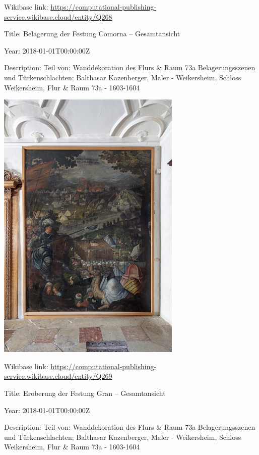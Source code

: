 \documentclass[
  letterpaper,
]{book}
\begin{document}
Wikibase link:
\url{https://computational-publishing-service.wikibase.cloud/entity/Q268}

Title: Belagerung der Festung Comorna -- Gesamtansicht

Year: 2018-01-01T00:00:00Z

Description: Teil von: Wanddekoration des Flurs \& Raum 73a
Belagerungsszenen und Türkenschlachten; Balthasar Kazenberger, Maler -
Weikersheim, Schloss Weikersheim, Flur \& Raum 73a - 1603-1604

\includegraphics{paintings_files/figure-pdf/cell-3-output-86.png}

Wikibase link:
\url{https://computational-publishing-service.wikibase.cloud/entity/Q269}

Title: Eroberung der Festung Gran -- Gesamtansicht

Year: 2018-01-01T00:00:00Z

Description: Teil von: Wanddekoration des Flurs \& Raum 73a
Belagerungsszenen und Türkenschlachten; Balthasar Kazenberger, Maler -
Weikersheim, Schloss Weikersheim, Flur \& Raum 73a - 1603-1604
\end{document}
